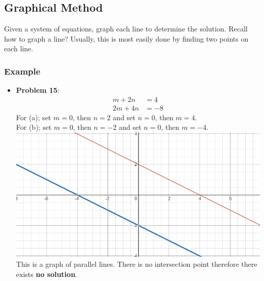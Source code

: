 \documentclass[14pt]{extarticle}
\begin{document}
\subsection*{Graphical Method}
Given a system of equations, graph each line to determine the solution. Recall how to graph a line? Usually, this is most easily done by finding two points on each line.
\subsubsection*{Example}
\begin{itemize}
\item \textbf{Problem 15}:
\begin{align*}
	m+2n &= 4 \tag{a}\\
	2m + 4n &= -8 \tag{b}
\end{align*}
For (a); set $m=0$, then $n=2$ and set $n=0$, then $m=4$.\\
For (b); set $m=0$, then $n=-2$ and set $n=0$, then $m=-4$. \\
\includegraphics[width=0.85\linewidth]{4-1_a-15} \\
This is a graph of parallel lines. There is no intersection point therefore there exists \textbf{no solution}.

\end{itemize}
\end{document}
